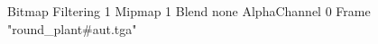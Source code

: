 {Bitmap
	{Filtering 1}
	{Mipmap 1}
	{Blend none}
	{AlphaChannel 0}
	{Frame "round_plant#aut.tga"}
}

